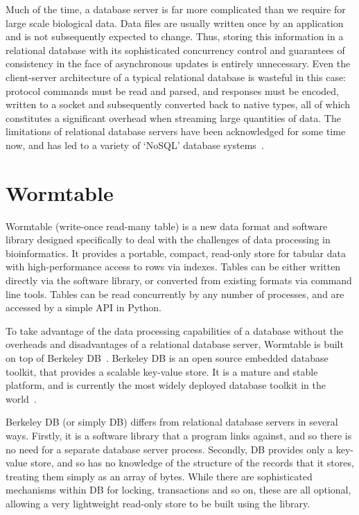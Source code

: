 \documentclass{bioinfo}
\begin{document}
Much of the time, a database server is far more complicated than
we require for large scale biological data. Data files 
are usually written once by an application 
and is not subsequently expected to change. Thus, storing this information 
in a relational database with its sophisticated concurrency control
and guarantees of consistency in the face of asynchronous updates
is entirely unnecessary. Even the client-server architecture of 
a typical relational database is wasteful in this case: protocol 
commands must be read and parsed, and responses must be encoded,
written to a socket and subsequently converted back to native types,
all of which constitutes a significant overhead when streaming large 
quantities of data. The limitations of relational database servers 
have been acknowledged for some time now, and has led to a 
variety of `NoSQL' database systems~\citep{m12}.

\section{Wormtable}

Wormtable (write-once read-many table) 
is a new data format and software library designed specifically
to deal with the challenges of data processing in bioinformatics.
It provides a portable, compact, read-only store for tabular
data with high-performance access to rows via indexes. Tables can
be either written directly via the software library, or converted
from existing formats via command line tools. Tables can be read 
concurrently by any number of processes, and are accessed by a 
simple API in Python.

To take advantage of the data processing capabilities of a database
without the overheads and disadvantages of a relational database 
server, Wormtable is built on top of Berkeley DB~\citep{obs99}.
Berkeley DB is an open source embedded database toolkit, that provides a
scalable key-value store. It is a mature and stable platform, 
and is currently the most widely deployed database toolkit in the 
world~\citep{sb12}.

Berkeley DB (or simply DB) 
differs from relational database servers in several ways. 
Firstly, it is a software library that a program links against, 
and so there is no need for a separate database server process.
Secondly, DB provides only a key-value store, and so has 
no knowledge of the structure of the records that it stores,
treating them simply as an array of bytes. While there 
are sophisticated 
mechanisms within DB for locking, transactions and so on, 
these are all optional, allowing a very lightweight 
read-only store to be built using the library.
\end{document}
